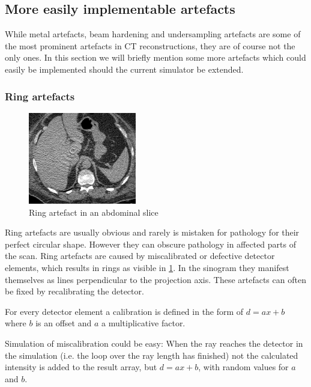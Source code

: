 \subsection{More easily implementable artefacts}
\par While metal artefacts, beam hardening and undersampling artefacts are some of the most prominent artefacts in CT reconstructions, they are of course not the only ones. In this section we will briefly mention some more artefacts which could easily be implemented should the current simulator be extended.
\subsubsection{Ring artefacts}
\begin{figure}[h]
	\centering
	\includegraphics[height=4cm]{images/ring.png}
	\caption{Ring artefact in an abdominal slice\cite{ringArt}}
	\label{ringArtefact}
\end{figure}
\par Ring artefacts are usually obvious and rarely is mistaken for pathology for their perfect circular shape. However they can obscure pathology in affected parts of the scan. Ring artefacts are caused by miscalibrated or defective detector elements, which results in rings as visible in \ref{ringArtefact}. In the sinogram they manifest themselves as lines perpendicular to the projection axis. These artefacts can often be fixed by recalibrating the detector.\cite{ringArt}\cite{CausesAndReductionTechniques}
\par For every detector element a calibration is defined in the form of \(d = ax+b\) where \(b\) is an offset and \(a\) a multiplicative factor.
\par Simulation of miscalibration could be easy: When the ray reaches the detector in the simulation (i.e. the loop over the ray length has finished) not the calculated intensity is added to the result array, but \(d = ax+b\), with random values for \(a\) and \(b\).
